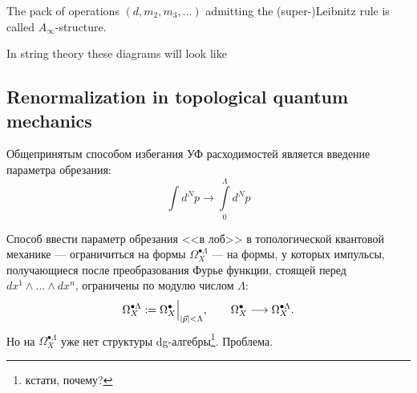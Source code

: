 \documentclass[11pt]{article}
\theoremstyle{remark}
\theoremstyle{definition}
\newcommand{\que}[1]{\footnote{\textcolor[rgb]{0.38,0.69,0.82}{#1}}}
\begin{document}
The pack of operations $(d, m_2, m_3, ...)$ admitting the (super-)Leibnitz rule is called $A_{\infty}$-structure.

In string theory these diagrams will look like

\begin{center}
\end{center}


\subsection{Renormalization in topological quantum mechanics}


Общепринятым способом избегания УФ расходимостей является введение параметра обрезания:
$$\int d^N p \longrightarrow \int\limits_0^{\Lambda} d^N p$$

Способ ввести параметр обрезания <<в лоб>> в топологической квантовой механике --- ограничиться на формы $\Omega_X^{\bullet \Lambda}$ --- на формы, у которых импульсы, получающиеся после преобразования Фурье функции, стоящей перед $dx^1 \wedge ... \wedge dx^n$, ограничены по модулю числом $\Lambda$: $$\Omega_X^{\bullet \Lambda} := \Omega_X^{\bullet}\Big|_{|\vec p| < \Lambda}, \hskip 20 pt \Omega_X^{\bullet} \longrightarrow \Omega_X^{\bullet \Lambda}.$$ Но на $\Omega_X^{\bullet \Lambda}$ уже нет структуры dg-алгебры\que{кстати, почему?}. Проблема.
\end{document}
